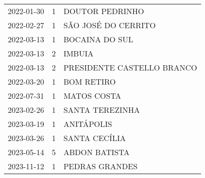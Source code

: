 \documentclass[
	12pt,				%
	openright,			%
	oneside,			%
	a4paper,			%
	english,			%
	french,				%
	spanish,			%
	brazil				%
	dvipsnames, table]{abntex2}
\begin{document}
\begin{longtable}[htbp]{ccl}
2022-01-30 & 1 & DOUTOR PEDRINHO \\
2022-02-27 & 1 & SÃO JOSÉ DO CERRITO \\
2022-03-13 & 1 & BOCAINA DO SUL \\
2022-03-13 & 2 & IMBUIA \\
2022-03-13 & 2 & PRESIDENTE CASTELLO BRANCO \\
2022-03-20 & 1 & BOM RETIRO \\
2022-07-31 & 1 & MATOS COSTA \\
2023-02-26 & 1 & SANTA TEREZINHA \\
2023-03-19 & 1 & ANITÁPOLIS \\
2023-03-26 & 1 & SANTA CECÍLIA \\
2023-05-14 & 5 & ABDON BATISTA \\
2023-11-12 & 1 & PEDRAS GRANDES \\
\end{longtable}
\end{document}
